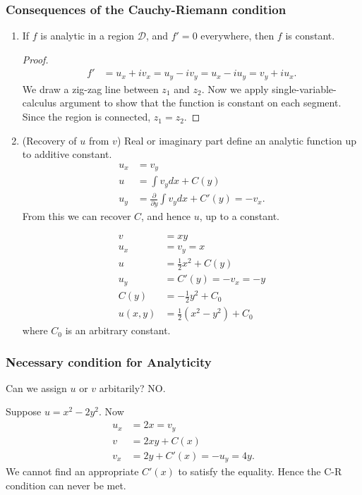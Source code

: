 \subsubsection{Consequences of the Cauchy-Riemann condition}

\begin{enumerate}
	\item If $f$ is analytic in a region $\mathcal{D}$, and $f' = 0$ everywhere, then $f$ is constant.
	\begin{proof}
		\begin{align*}
			f'&= u_x + iv_x = u_y - iv_y = u_x - iu_y = v_y + iu_x
		.\end{align*}
		We draw a zig-zag line between $z_1$ and $z_2$.  Now we apply single-variable-calculus argument to show that the function is constant on each segment. Since the region is connected, $z_1 = z_2$.
	\end{proof}
\item (Recovery of $u$ from $v $) 
		Real or imaginary part define an analytic function up to additive constant.
	\begin{align*}
		u_x &= v_y \\
		u &= \int v_y dx + C(y)\\
		u_y &=  \frac{\partial }{\partial y} \int v_y dx + C'(y) = -v_x
	.\end{align*}
	From this we can recover $C$, and hence $u$, up to a constant.
	\begin{example}
		\begin{align*}
			v &=  xy \\
			u_x &=  v_y = x \\
			u &=  \frac{1}{2}x^2 + C(y) \\
			u_y &= C'(y) = -v_x = - y\\
			C(y) &= -\frac{1}{2}y^2 + C_0 \\
			u(x,y) &=  \frac{1}{2}\left( x^2 - y^2 \right) +C_0
		\end{align*}
		where $C_0$ is an arbitrary constant.

	\end{example}
	
\end{enumerate}

	\subsubsection{Necessary condition for Analyticity}
	Can we assign $u$ or $v$ arbitarily? NO. 
\begin{example}
	Suppose $u = x^2 - 2y^2$. Now
	\begin{align*}
		u_x &= 2x = v_y \\
		v &= 2xy + C(x) \\
		v_x &= 2y + C'(x) = -u_y = 4y
	.\end{align*}
	We cannot find an appropriate $C'(x)$ to satisfy the equality. Hence the C-R condition can never be met.
\end{example}



